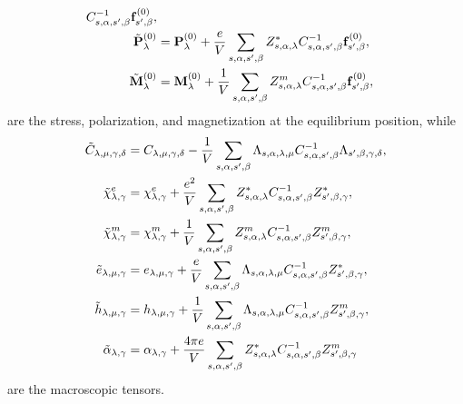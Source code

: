 \documentclass[12pt,a4paper]{article}
\begin{document}
{\begin{align}
C^{-1}_{s,\alpha,s',\beta} {\bf f}^{(0)}_{s',\beta}, \\
\tilde {\bf P}^{(0)}_\lambda&= {\bf P}^{(0)}_\lambda +{e\over V}
\sum_{s,\alpha,s',\beta} Z^*_{s,\alpha,\lambda} C^{-1}_{s,\alpha,s',\beta}
{\bf f}^{(0)}_{s',\beta}, \\
\tilde {\bf M}^{(0)}_\lambda&= {\bf M}^{(0)}_\lambda +{1\over V}
\sum_{s,\alpha,s',\beta} Z^m_{s,\alpha,\lambda} C^{-1}_{s,\alpha,s',\beta}
{\bf f}^{(0)}_{s',\beta},
\end{align}
are the stress, polarization, and magnetization at the equilibrium position,
while
\begin{align}
\tilde C_{\lambda,\mu,\gamma,\delta}&= C_{\lambda,\mu,\gamma,\delta}
-{1\over V}\sum_{s,\alpha,s',\beta} \Lambda_{s,\alpha,\lambda,\mu}
C^{-1}_{s,\alpha,s',\beta}  \Lambda_{s',\beta,\gamma,\delta},\\
\tilde \chi^e_{\lambda,\gamma}&= \chi^e_{\lambda,\gamma} 
+{e^2 \over V} \sum_{s,\alpha,s',\beta} Z^*_{s,\alpha,\lambda}
C^{-1}_{s,\alpha,s',\beta}  Z^*_{s',\beta,\gamma},\\
\tilde \chi^m_{\lambda,\gamma}&= \chi^m_{\lambda,\gamma} 
+{1 \over V} \sum_{s,\alpha,s',\beta} Z^m_{s,\alpha,\lambda}
C^{-1}_{s,\alpha,s',\beta}  Z^m_{s',\beta,\gamma}, \\
\tilde e_{\lambda,\mu,\gamma}&= e_{\lambda,\mu,\gamma}
+{e\over V}\sum_{s,\alpha,s',\beta} 
\Lambda_{s,\alpha,\lambda,\mu} C^{-1}_{s,\alpha,s',\beta} 
Z^*_{s',\beta,\gamma},\\
\tilde h_{\lambda,\mu,\gamma}&= h_{\lambda,\mu,\gamma}
+{1\over V}\sum_{s,\alpha,s',\beta} \Lambda_{s,\alpha,\lambda,\mu}
C^{-1}_{s,\alpha,s',\beta} Z^m_{s',\beta,\gamma},\\
\tilde \alpha_{\lambda,\gamma}&= \alpha_{\lambda,\gamma}
+{4 \pi e \over V}\sum_{s,\alpha,s',\beta} Z^*_{s,\alpha,\lambda}
C^{-1}_{s,\alpha,s',\beta}  Z^m_{s',\beta,\gamma}
\end{align}
are the macroscopic tensors.
}
\\
\newpage
\end{document}
